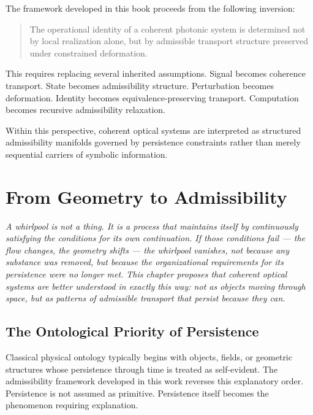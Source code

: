 \documentclass[11pt,openany]{book}
\theoremstyle{definition}
\theoremstyle{plain}
\begin{document}
The framework developed in this book proceeds from the following inversion:

\begin{quote}
The operational identity of a coherent photonic system is determined not by local realization alone, but by admissible transport structure preserved under constrained deformation.
\end{quote}

This requires replacing several inherited assumptions. Signal becomes coherence transport. State becomes admissibility structure. Perturbation becomes deformation. Identity becomes equivalence-preserving transport. Computation becomes recursive admissibility relaxation.

Within this perspective, coherent optical systems are interpreted as structured admissibility manifolds governed by persistence constraints rather than merely sequential carriers of symbolic information.


\chapter{From Geometry to Admissibility}

\noindent\textit{A whirlpool is not a thing. It is a process that maintains itself by continuously satisfying the conditions for its own continuation. If those conditions fail --- the flow changes, the geometry shifts --- the whirlpool vanishes, not because any substance was removed, but because the organizational requirements for its persistence were no longer met. This chapter proposes that coherent optical systems are better understood in exactly this way: not as objects moving through space, but as patterns of admissible transport that persist because they can.}

\bigskip

\section{The Ontological Priority of Persistence}

Classical physical ontology typically begins with objects, fields, or geometric structures whose persistence through time is treated as self-evident. The admissibility framework developed in this work reverses this explanatory order. Persistence is not assumed as primitive. Persistence itself becomes the phenomenon requiring explanation.
\end{document}
